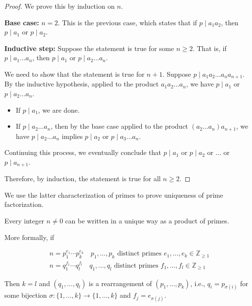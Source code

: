 \documentclass[11pt, draft]{article}
\begin{document}
\begin{proof}
    We prove this by induction on \(n\).

    \textbf{Base case:} \(n = 2\). This is the previous case, which states that if \(p \mid a_1 a_2\), then \(p \mid a_1\) or \(p \mid a_2\).

    \textbf{Inductive step:} Suppose the statement is true for some \(n \geq 2\). That is, if \(p \mid a_1 \ldots a_n\), then \(p \mid a_1\) or \(p \mid a_2 \ldots a_n\).

    We need to show that the statement is true for \(n + 1\). Suppose \(p \mid a_1
    a_2 \ldots a_n a_{n+1}\). By the inductive hypothesis, applied to the product
    \(a_1 a_2 \ldots a_n\), we have \(p \mid a_1\) or \(p \mid a_2 \ldots a_n\).
    \begin{itemize}
        \item If \(p \mid a_1\), we are done.
        \item If \(p \mid a_2 \ldots a_n\), then by the base case applied to the product
              \((a_2 \ldots a_n) a_{n+1}\), we have \(p \mid a_2 \ldots a_n\) implies \(p
              \mid a_2\) or \(p \mid a_3 \ldots a_n\).
    \end{itemize}
    Continuing this process, we eventually conclude that \(p \mid a_1\) or \(p \mid a_2\) or \(\ldots\) or \(p \mid a_{n+1}\).

    Therefore, by induction, the statement is true for all \(n \geq 2\).
\end{proof}

We use the latter characterization of primes to prove uniqueness of prime
factorization.
\begin{theorem}
    Every integer \(n \neq 0\) can be written in a unique way as a product of primes.

    More formally, if

    \[
        \begin{aligned}
             & n = p_1^{e_1} \cdots p_k^{e_k} \quad p_1, \ldots, p_k \text{ distinct primes } e_1, \ldots, e_k \in \mathbb{Z}_{\geq 1} \\
             & n = q_1^{f_1} \cdots q_l^{f_l} \quad q_1, \ldots, q_l \text{ distinct primes } f_1, \ldots, f_l \in \mathbb{Z}_{\geq 1}
        \end{aligned}
    \]

    Then \(k = l\) and \((q_1, \ldots, q_l)\) is a rearrangement of \((p_1, \ldots,
    p_k)\), i.e., \(q_i = p_{\sigma(i)}\) for some bijection \(\sigma: \{1, \ldots,
    k\} \rightarrow \{1, \ldots, k\}\) and \(f_j = e_{\sigma(j)}\).
\end{theorem}
\end{document}
